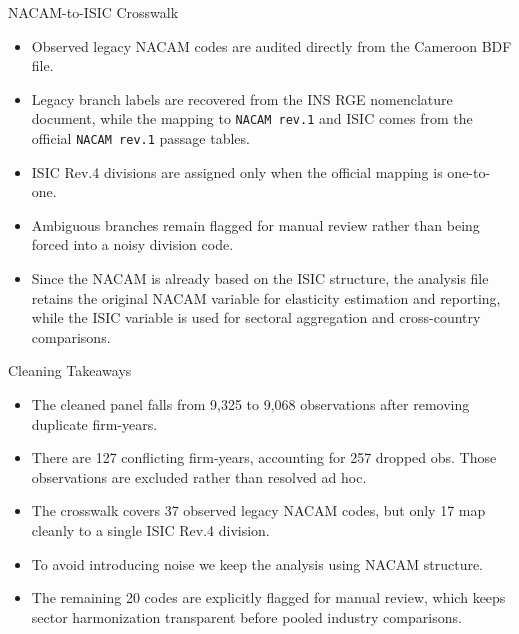 \documentclass[aspectratio=169]{beamer}
\begin{document}
\begin{frame}{NACAM-to-ISIC Crosswalk}
    \small
    \begin{itemize}
        \item Observed legacy NACAM codes are audited directly from the Cameroon BDF file.
        \item Legacy branch labels are recovered from the INS RGE nomenclature document, while the mapping to \texttt{NACAM rev.1} and ISIC comes from the official \texttt{NACAM rev.1} passage tables.
        \item ISIC Rev.4 divisions are assigned only when the official mapping is one-to-one.
        \item Ambiguous branches remain flagged for manual review rather than being forced into a noisy division code.
        \item Since the NACAM is already based on the ISIC structure, the analysis file retains the original NACAM variable for elasticity estimation and reporting, while the ISIC variable is used for sectoral aggregation and cross-country comparisons.
    \end{itemize}

    \vspace{0.4cm}
    \centering
\end{frame}

\begin{frame}{Cleaning Takeaways}
    \begin{itemize}
        \item The cleaned panel falls from 9,325 to 9,068 observations after removing duplicate firm-years.
        \item There are 127 conflicting firm-years, accounting for 257 dropped obs. Those observations are excluded rather than resolved ad hoc.
        \item The crosswalk covers 37 observed legacy NACAM codes, but only 17 map cleanly to a single ISIC Rev.4 division. 
        \item To avoid introducing noise we keep the analysis using NACAM structure.
        \item The remaining 20 codes are explicitly flagged for manual review, which keeps sector harmonization transparent before pooled industry comparisons.
    \end{itemize}
\end{frame}
\end{document}
